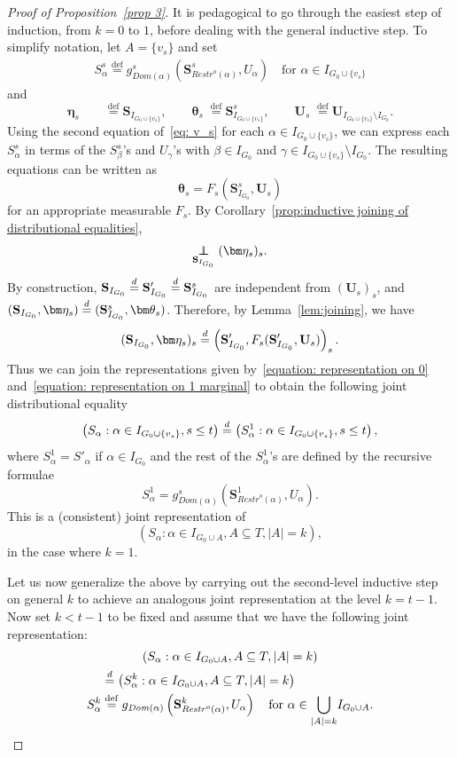 \documentclass[AHL,Unicode,longabstracts,published]{cedram}
\newcommand{\independent}{\protect\mathpalette{\protect\independenT}{\perp}}\def\independenT#1#2{\mathrel{\rlap{$#1#2$}\mkern2mu{#1#2}}}
\newcommand{\alf}{\alpha}%
\newcommand*{\defeq}{\stackrel{\mathrm{def}}{=}}
\renewcommand{\d}{\buildrel{d}\over{=}}
\newcommand*\srstr{\mathit{Restr}^o}
\newcommand*\dom{\mathit{Dom}}
\newcommand*\bS{\mathbf{S}}
\newcommand*\bU{\mathbf{U}}
\begin{document}
\begin{proof}[Proof of Proposition~\ref{prop 3}]
It is pedagogical to go through the easiest step of induction, from $k=0$ to $1$, before dealing with the general inductive step. To simplify notation, let $A=\{v_s\}$ and set
\begin{align}\label{eq: v_s}
S^s_\alf
\defeq g^s_{\dom(\alf)}\left(\bS^s_{\srstr(\alf)}, U_\alf\right) \quad\text{for } \alf \in I_{G_0 \cup \{v_s\}}
\end{align}
and
\[
\bm\eta_s \qquad
\defeq\bS_{I_{G_0 \cup \{v_s\}}},\qquad
\bm\theta_s \;
\defeq\bS^s_{I_{G_0 \cup \{v_s\}}}, \qquad
\bU_s \;
\defeq\bU_{I_{{G_0} \cup \{v_s\}} \setminus I_{G_0}}.
\]
Using the second equation of~\eqref{eq: v_s} for each $\alpha \in I_{G_0 \cup \{v_s\}}$, we can express each $S^s_\alpha$ in terms of the $S^s_\beta$'s
and $U_\gamma$'s with $\beta \in I_{G_0}$ and $\gamma \in I_{G_0 \cup \{v_s\}}\setminus I_{G_0}$. The resulting equations can be written as
\[
\bm\theta_s=F_s\left(\bS^s_{I_{G_0}}, \bU_s\right)
\]
for an appropriate measurable $F_s$. By Corollary~\ref{prop:inductive joining of distributional equalities},
\[
\underset{\bS_{I_{G_0}}}{\independent} (\bm\eta_s)_s.
\]
By construction, $\bS_{I_{G_0}} \d \bS'_{I_{G_0}}\d \bS^s_{I_{G_0}}$ are independent from $(\bU_s)_s$, and $(\bS_{I_{G_0}},\bm\eta_s)\d (\bS^s_{I_{G_0}},\bm\theta_s)$. Therefore, by Lemma~\ref{lem:joining}, we have
\[
(\bS_{I_{G_0}}, \bm\eta_s)_s \d \left(\bS'_{I_{G_0}},F_s(\bS'_{I_{G_0}},\bU_s)\right)_s.
\]
Thus we can join the representations given by~\eqref{equation: representation on 0} and~\eqref{equation: representation on 1 marginal} to obtain the following joint distributional equality
\begin{equation}\label{equation: representation on 1 joint}
\left(S_\alf : \alf \in I_{G_0 \cup \{v_s\}}, s \leq t\right)\d\left(S^1_\alf : \alf \in I_{G_0 \cup \{v_s\}}, s \leq t\right),
\end{equation}
where $S^1_\alf =S'_\alf $ if $\alf \in I_{G_0}$ and the rest of the $S^1_\alf $'s are defined by the recursive formulae
\[
S^1_\alf =g^s_{\dom(\alf)}\left(\bS^1_{\srstr(\alf)}, U_\alf\right).
\]
This is a (consistent) joint representation of
\[
(S_\alf : \alf \in I_{G_0 \cup A}, A \subseteq T, |A|=k),
\]
in the case where $k=1$.

Let us now generalize the above by carrying out the second-level inductive step on general $k$ to achieve an analogous joint representation at the level $k=t-1$. Now set $k<t-1$ to be fixed and assume that we have the following joint representation:
\begin{multline}\label{equation: representation on k joint}
\left(S_\alf :\alf \in I_{G_0 \cup A}, A \subseteq T, |A|=k\right) \\
\begin{aligned}
&\d \left(S^k_\alf : \alf \in I_{G_0 \cup A}, A \subseteq T, |A|=k\right)
\\
S^k_\alf &
\defeq g_{\dom(\alf)}\left(\bS^k_{\srstr(\alf)}, U_\alf\right) \quad \text{for } \alf \in \underset{|A|=k}{\bigcup}I_{G_0 \cup A}.
\end{aligned}
\end{multline}



\end{proof}
\end{document}
